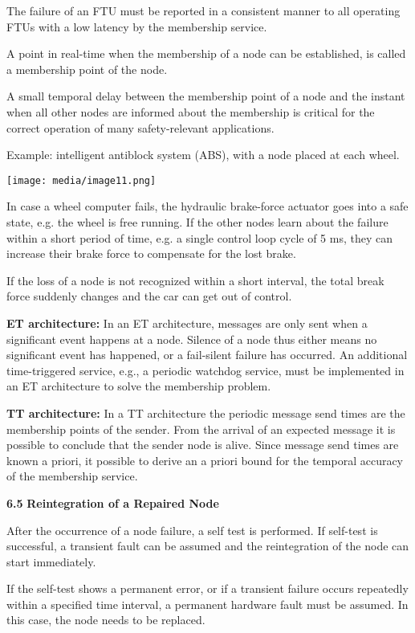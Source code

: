 The failure of an FTU must be reported in a consistent manner to all
operating FTUs with a low latency by the membership service.

A point in real-time when the membership of a node can be established,
is called a membership point of the node.

A small temporal delay between the membership point of a node and the
instant when all other nodes are informed about the membership is
critical for the correct operation of many safety-relevant applications.

Example: intelligent antiblock system (ABS), with a node placed at each
wheel.

\texttt{[image: media/image11.png]}

In case a wheel computer fails, the hydraulic brake-force actuator goes
into a safe state, e.g. the wheel is free running. If the other nodes
learn about the failure within a short period of time, e.g. a single
control loop cycle of 5 ms, they can increase their brake force to
compensate for the lost brake.

If the loss of a node is not recognized within a short interval, the
total break force suddenly changes and the car can get out of control.

\protect\hypertarget{OLEux5fLINK1}{}{}\textbf{ET architecture:} In an ET
architecture, messages are only sent when a significant event happens at
a node. Silence of a node thus either means no significant event has
happened, or a fail-silent failure has occurred. An additional
time-triggered service, e.g., a periodic watchdog service, must be
implemented in an ET architecture to solve the membership problem.

\textbf{TT architecture:} In a TT architecture the periodic message send
times are the membership points of the sender. From the arrival of an
expected message it is possible to conclude that the sender node is
alive. Since message send times are known a priori, it possible to
derive an a priori bound for the temporal accuracy of the membership
service.

\textbf{6.5} \protect\hypertarget{teil6}{}{}\textbf{Reintegration of a
Repaired Node}

After the occurrence of a node failure, a self test is performed. If
self-test is successful, a transient fault can be assumed and the
reintegration of the node can start immediately.

If the self-test shows a permanent error, or if a transient failure
occurs repeatedly within a specified time interval, a permanent hardware
fault must be assumed. In this case, the node needs to be replaced.

